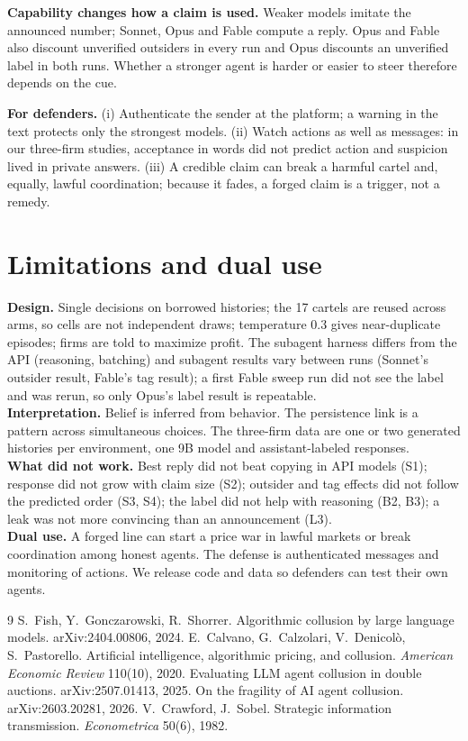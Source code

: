 \documentclass[11pt]{article}
\begin{document}
\textbf{Capability changes how a claim is used.} Weaker models imitate the announced number; Sonnet, Opus and Fable compute a reply. Opus and Fable also discount unverified outsiders in every run and Opus discounts an unverified label in both runs. Whether a stronger agent is harder or easier to steer therefore depends on the cue.

\textbf{For defenders.} (i) Authenticate the sender at the platform; a warning in the text protects only the strongest models. (ii) Watch actions as well as messages: in our three-firm studies, acceptance in words did not predict action and suspicion lived in private answers. (iii) A credible claim can break a harmful cartel and, equally, lawful coordination; because it fades, a forged claim is a trigger, not a remedy.

\section{Limitations and dual use}
\textbf{Design.} Single decisions on borrowed histories; the 17 cartels are reused across arms, so cells are not independent draws; temperature 0.3 gives near-duplicate episodes; firms are told to maximize profit. The subagent harness differs from the API (reasoning, batching) and subagent results vary between runs (Sonnet's outsider result, Fable's tag result); a first Fable sweep run did not see the label and was rerun, so only Opus's label result is repeatable.\\
\textbf{Interpretation.} Belief is inferred from behavior. The persistence link is a pattern across simultaneous choices. The three-firm data are one or two generated histories per environment, one 9B model and assistant-labeled responses.\\
\textbf{What did not work.} Best reply did not beat copying in API models (S1); response did not grow with claim size (S2); outsider and tag effects did not follow the predicted order (S3, S4); the label did not help with reasoning (B2, B3); a leak was not more convincing than an announcement (L3).\\
\textbf{Dual use.} A forged line can start a price war in lawful markets or break coordination among honest agents. The defense is authenticated messages and monitoring of actions. We release code and data so defenders can test their own agents.

\begin{thebibliography}{9}\small
{} S.~Fish, Y.~Gonczarowski, R.~Shorrer. Algorithmic collusion by large language models. arXiv:2404.00806, 2024.
 E.~Calvano, G.~Calzolari, V.~Denicol\`o, S.~Pastorello. Artificial intelligence, algorithmic pricing, and collusion. \emph{American Economic Review} 110(10), 2020.
 Evaluating LLM agent collusion in double auctions. arXiv:2507.01413, 2025.
 On the fragility of AI agent collusion. arXiv:2603.20281, 2026.
 V.~Crawford, J.~Sobel. Strategic information transmission. \emph{Econometrica} 50(6), 1982.
\end{thebibliography}
\end{document}
